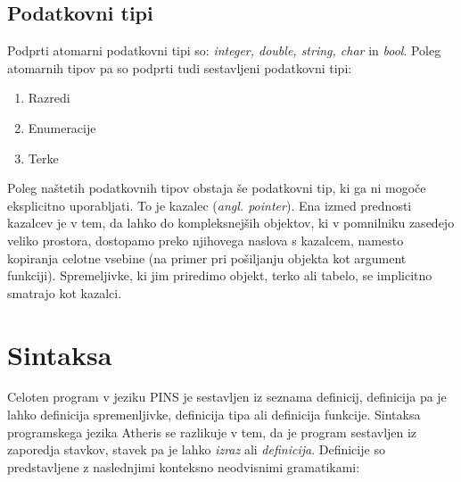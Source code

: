\documentclass[a4paper, 12p]{book}
\begin{document}
\subsection{Podatkovni tipi}

Podprti atomarni podatkovni tipi so: \textit{integer, double, string, char} in \textit{bool}. Poleg atomarnih tipov pa so podprti tudi sestavljeni podatkovni tipi:

\begin{enumerate}
	\item Razredi
	\item Enumeracije
	\item Terke
\end{enumerate}

Poleg naštetih podatkovnih tipov obstaja še podatkovni tip, ki ga ni mogoče eksplicitno uporabljati. To je kazalec (\textit{angl. pointer}). Ena izmed prednosti kazalcev je v tem, da lahko do kompleksnejših objektov, ki v pomnilniku zasedejo veliko prostora, dostopamo preko njihovega naslova s kazalcem, namesto kopiranja celotne vsebine (na primer pri pošiljanju objekta kot argument funkciji). Spremeljivke, ki jim priredimo objekt, terko ali tabelo, se implicitno smatrajo kot kazalci. \\

\section{Sintaksa}

Celoten program v jeziku PINS je sestavljen iz seznama definicij, definicija pa je lahko definicija spremenljivke, definicija tipa ali definicija funkcije. Sintaksa programskega jezika Atheris se razlikuje v tem, da je program sestavljen iz zaporedja stavkov, stavek pa je lahko \textit{izraz} ali \textit{definicija}. Definicije so predstavljene z naslednjimi konteksno neodvisnimi gramatikami:
\end{document}
